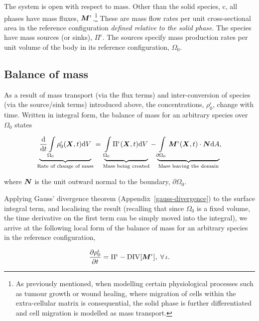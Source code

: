 The system is open with respect to mass. Other than the solid species,
$\mathrm{c}$, all phases have mass fluxes, $\mbox{\boldmath$ M$}^\iota$.\footnote{As
  previously mentioned, when modelling certain physiological processes
  such as tumour growth or wound healing, where migration of cells
  within the extra-cellular matrix is consequential, the solid phase
  is further differentiated and cell migration is modelled as mass
  transport.}  These are mass flow rates per unit cross-sectional area
in the reference configuration \emph{defined relative to the solid
  phase}. The species have mass sources (or sinks), $\Pi^\iota$. The
sources specify mass production rates per unit volume of the body in
its reference configuration, $\Omega_0$.

\subsection{Balance of mass}
\label{balance-of-mass}

As a result of mass transport (via the flux terms) and
inter-conversion of species (via the source/sink terms) introduced
above, the concentrations, $\rho_0^\iota$, change with time. Written
in integral form, the balance of mass for an arbitrary species over
$\Omega_0$ states

\begin{equation}
\underbrace{\frac{\mathrm{d}}{\mathrm{d}t} \int\limits_{\Omega_0}
  \rho_0^\iota (\mbox{\boldmath$ X$},t)\mathrm{d}V}_{\text{Rate of change of mass}} =
\underbrace{\int\limits_{\Omega_0} \Pi^\iota
  (\mbox{\boldmath$ X$},t)\mathrm{d}V}_{\text{Mass being created}}
-\underbrace{\int\limits_{\partial\Omega_0}\mbox{\boldmath$ M$}^\iota(\mbox{\boldmath$ X$},t)\cdot\mbox{\boldmath$ N$}
  \mathrm{d}A}_{\text{Mass leaving the domain}},
\label{globalbalanceofmass}
\end{equation}

\noindent where $\mbox{\boldmath$ N$}$ is the unit outward normal to the boundary,
$\partial\Omega_0$.

Applying Gauss' divergence theorem (Appendix~\ref{gauss-divergence})
to the surface integral term, and localising the result (recalling
that since $\Omega_0$ is a fixed volume, the time derivative on the
first term can be simply moved into the integral), we arrive at the
following local form of the balance of mass for an arbitrary species
in the reference configuration,

\begin{equation}
\frac{\partial\rho_0^\iota}{\partial t} = \Pi^\iota -
\mathrm{DIV}[\mbox{\boldmath$ M$}^\iota],\;\forall\,\iota.
\label{localbalanceofmass}
\end{equation}

